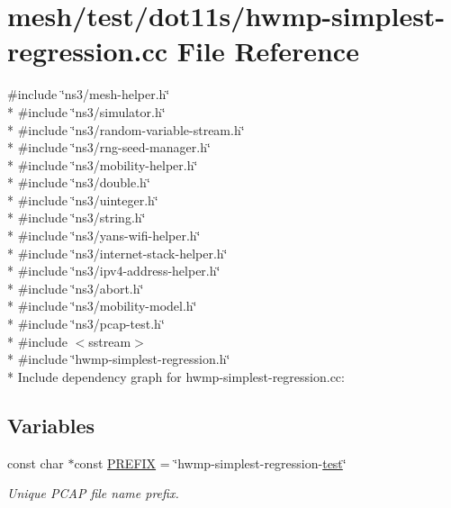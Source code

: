 \hypertarget{hwmp-simplest-regression_8cc}{}\section{mesh/test/dot11s/hwmp-\/simplest-\/regression.cc File Reference}
\label{hwmp-simplest-regression_8cc}
{\ttfamily \#include \char`\"{}ns3/mesh-\/helper.\+h\char`\"{}}\\*
{\ttfamily \#include \char`\"{}ns3/simulator.\+h\char`\"{}}\\*
{\ttfamily \#include \char`\"{}ns3/random-\/variable-\/stream.\+h\char`\"{}}\\*
{\ttfamily \#include \char`\"{}ns3/rng-\/seed-\/manager.\+h\char`\"{}}\\*
{\ttfamily \#include \char`\"{}ns3/mobility-\/helper.\+h\char`\"{}}\\*
{\ttfamily \#include \char`\"{}ns3/double.\+h\char`\"{}}\\*
{\ttfamily \#include \char`\"{}ns3/uinteger.\+h\char`\"{}}\\*
{\ttfamily \#include \char`\"{}ns3/string.\+h\char`\"{}}\\*
{\ttfamily \#include \char`\"{}ns3/yans-\/wifi-\/helper.\+h\char`\"{}}\\*
{\ttfamily \#include \char`\"{}ns3/internet-\/stack-\/helper.\+h\char`\"{}}\\*
{\ttfamily \#include \char`\"{}ns3/ipv4-\/address-\/helper.\+h\char`\"{}}\\*
{\ttfamily \#include \char`\"{}ns3/abort.\+h\char`\"{}}\\*
{\ttfamily \#include \char`\"{}ns3/mobility-\/model.\+h\char`\"{}}\\*
{\ttfamily \#include \char`\"{}ns3/pcap-\/test.\+h\char`\"{}}\\*
{\ttfamily \#include $<$sstream$>$}\\*
{\ttfamily \#include \char`\"{}hwmp-\/simplest-\/regression.\+h\char`\"{}}\\*
Include dependency graph for hwmp-\/simplest-\/regression.cc\+:
\subsection*{Variables}
\begin{DoxyCompactItemize}
\item 
const char $\ast$const \hyperlink{hwmp-simplest-regression_8cc_a61dc66981fa47bfd0066a57a487c599c}{P\+R\+E\+F\+IX} = \char`\"{}hwmp-\/simplest-\/regression-\/\hyperlink{main-test-sync_8cc_a708a4c1a4d0c4acc4c447310dd4db27f}{test}\char`\"{}
\begin{DoxyCompactList}\small\item\em Unique P\+C\+AP file name prefix. \end{DoxyCompactList}\end{DoxyCompactItemize}


